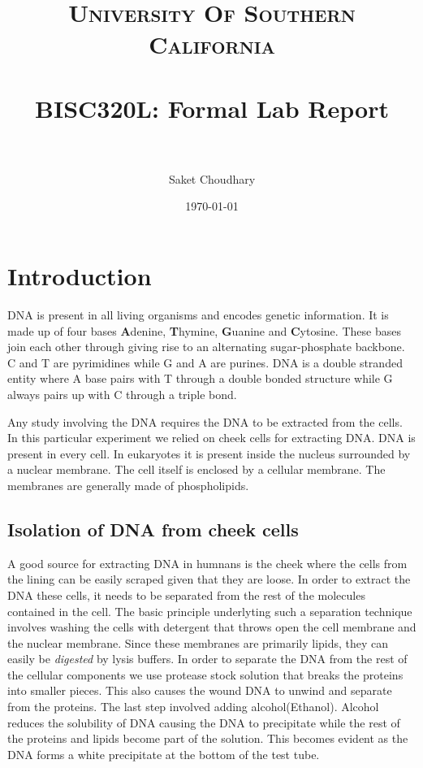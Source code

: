 \documentclass[paper=a4, fontsize=11pt]{scrartcl} %
\title{	
\normalfont \normalsize 
\textsc{University Of Southern California} \\ [25pt] %
\horrule{0.5pt} \\[0.4cm] %
\huge BISC320L: Formal Lab Report  \\ %
\horrule{2pt} \\[0.5cm] %
}
\author{Saket Choudhary} %
\date{\normalsize\today} %
\numberwithin{equation}{section} %
\numberwithin{figure}{section} %
\numberwithin{table}{section} %
\begin{document}
\maketitle %


\section{Introduction}

DNA is present in all living organisms and encodes genetic information. It is made up of four bases \textbf{A}denine, \textbf{T}hymine, \textbf{G}uanine and\textbf{ C}ytosine. These bases join each other through giving rise to an alternating sugar-phosphate backbone. C and T are pyrimidines while G and A are purines. DNA is a double stranded entity where A base pairs with T through a double bonded structure while G always pairs up with C through a triple bond.

Any study  involving the DNA requires the DNA to be extracted from the cells. In this particular experiment we relied on cheek cells for extracting DNA. DNA is present in every cell. In eukaryotes it is present inside the nucleus surrounded by a nuclear membrane.  The cell itself is enclosed by a cellular membrane. The membranes are generally made of phospholipids. 

\subsection{Isolation of DNA from cheek cells}
A good source for extracting DNA in humnans is the cheek where  the cells from the lining can be easily scraped given that they are loose. In order to extract the DNA these cells, it needs to be separated from the rest of the molecules contained in the cell. The basic principle underlyting such a separation technique involves washing the cells with detergent that throws open the cell membrane and the nuclear membrane. 
Since these membranes are primarily lipids, they can easily be \textit{digested} by lysis buffers. In order to separate the DNA from the rest of the cellular components we use protease stock solution that breaks the proteins into smaller pieces. This also causes the wound DNA to unwind and separate from the proteins. The last step involved adding alcohol(Ethanol). Alcohol reduces the 	solubility of DNA causing the DNA to precipitate while the rest of the proteins and lipids become part of the solution. This becomes evident as the DNA forms a white precipitate at the bottom of the test tube.
\end{document}
